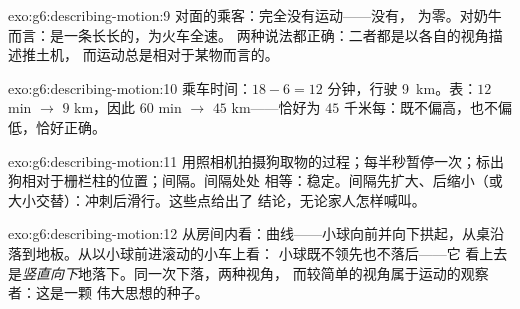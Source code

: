 \begin{solution}{exo:g6:describing-motion:9}
对面的乘客：完全没有运动——没有，
为零。对奶牛而言：是一条长长的，为火车全速。
两种说法都正确：二者都是以各自的视角描述推土机，
而运动总是相对于某物而言的。
\end{solution}

\begin{solution}{exo:g6:describing-motion:10}
乘车时间：$18 - 6 = 12$ 分钟，行驶 \qty{9}{km}。表：$12$
min $\to$ $9$ km，因此 $60$ min $\to$ $45$ km——恰好为 $45$
千米每：既不偏高，也不偏低，恰好正确。
\end{solution}

\begin{solution}{exo:g6:describing-motion:11}
用照相机拍摄狗取物的过程；每半秒暂停一次；标出
狗相对于栅栏柱的位置；间隔。间隔处处
相等：稳定。间隔先扩大、后缩小（或
大小交替）：冲刺后滑行。这些点给出了
结论，无论家人怎样喊叫。
\end{solution}

\begin{solution}{exo:g6:describing-motion:12}
从房间内看：曲线——小球向前并向下拱起，从桌沿
落到地板。从以小球前进滚动的小车上看：
小球既不领先也不落后——它
看上去是\emph{竖直向下}地落下。同一次下落，两种视角，
而较简单的视角属于运动的观察者：这是一颗
伟大思想的种子。
\end{solution}

